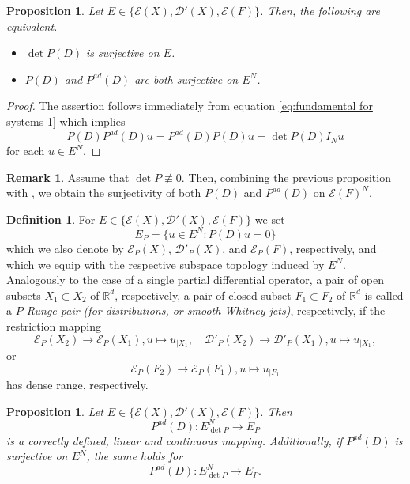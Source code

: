 \documentclass[a4paper,10pt]{amsart}
\newtheorem{proposition}[theorem]{Proposition}
\newtheorem*{crucial lemma}{Lemma \ref{lem:nice polynomial2}}
\theoremstyle{definition}
\newtheorem{definition}[theorem]{Definition}
\newtheorem{remark}[theorem]{Remark}
\newcommand{\R}{\mathbb{R}}
\newcommand{\Pad}{P^{ad}}
\newcommand{\detP}{\operatorname{det}\!P}
\begin{document}
\begin{proposition}\label{prop:surjcetivity of systems}
	Let $E\in\{\mathscr{E}(X), \mathscr{D}'(X), \mathscr{E}(F)\}$. Then, the following are equivalent.
	\begin{itemize}
		\item[(i)] $\detP(D)$ is surjective on $E$.
		\item[(ii)] $P(D)$ and $\Pad(D)$ are both surjective on $E^N$. 
	\end{itemize}
\end{proposition}

\begin{proof}
	The assertion follows immediately from equation \eqref{eq:fundamental for systems 1} which implies
	\begin{equation}\label{eq:fundamental for systems 2}
		P(D)\Pad(D)u=\Pad(D)P(D)u=\detP(D)I_N u
	\end{equation}
	for each $u\in E^N$.
\end{proof}

\begin{remark}\label{rem:surjectivity of Whitney}
	Assume that $\detP\not\equiv 0$. Then, combining the previous proposition with \cite[Introduction to Chapter 6]{Frerick-Habilitation}, we obtain the surjectivity of both $P(D)$ and $\Pad(D)$ on $\mathscr{E}(F)^N$.
\end{remark}

\begin{definition}
	For $E\in\{\mathscr{E}(X), \mathscr{D}'(X), \mathscr{E}(F)\}$ we set
	\[E_P=\{u\in E^N\colon P(D)u=0\}\]
	which we also denote by $\mathscr{E}_P(X)$, $\mathscr{D}'_P(X)$, and $\mathscr{E}_P(F)$, respectively, and which we equip with the respective subspace topology induced by $E^N$. Analogously to the case of a single partial differential operator, a pair of open subsets $X_1\subset X_2$ of $\R^d$, respectively, a pair of closed subset $F_1\subset F_2$ of $\R^d$ is called a \emph{$P$-Runge pair (for distributions, or smooth Whitney jets)}, respectively, if the restriction mapping
    \[
    \mathscr{E}_P(X_2)\rightarrow \mathscr{E}_P(X_1), u\mapsto u_{|X_1},\quad \mathscr{D}'_P(X_2)\rightarrow \mathscr{D}'_P(X_1), u\mapsto u_{|X_1},
    \]
    or
    \[\mathscr{E}_P(F_2)\rightarrow \mathscr{E}_P(F_1), u\mapsto u_{|F_1}\]
    has dense range, respectively.
\end{definition}

\begin{proposition}\label{prop:fundamental for Runge for systems}
	Let $E\in\{\mathscr{E}(X), \mathscr{D}'(X), \mathscr{E}(F)\}$. Then
	\[\Pad(D):E_{\detP}^N\rightarrow E_P\]
	is a correctly defined, linear and continuous mapping. Additionally, if $\Pad(D)$ is surjective on $E^N$, the same holds for
	\[\Pad(D):E_{\detP}^N\rightarrow E_P.\]
\end{proposition}
\end{document}
